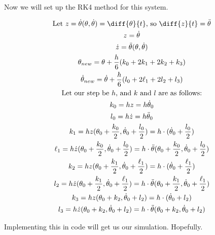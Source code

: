 \documentclass[]{article}
\begin{document}
Now we will set up the RK4 method for this system.

\begin{gather*}
	\text{Let } z = \dot{\theta}(\theta, \dot{\theta}) = \diff{\theta}{t} \text{, so } \diff{z}{t} = \ddot{\theta} \\
	z = \dot{\theta} \\
	\dot{z} = \ddot{\theta}(\theta, \dot{\theta}) \\
	\theta_{new} = \theta + \frac{h}{6}(k_0 + 2k_1 + 2k_2 + k_3) \\
	\dot{\theta}_{new} = \dot{\theta} + \frac{h}{6}(l_0 + 2\ell_1 + 2l_2 + l_3) \\
	\text{Let our step be $h$, and $k$ and $l$ are as follows:}\\
	k_0 = hz = h\dot{\theta}_0 \\
	l_0 = h\dot{z} = h\ddot{\theta}_0 \\
	k_1 = hz(\theta_0 + \frac{k_0}{2}, \dot{\theta}_0 + \frac{l_0}{2}) = h\cdot(\dot{\theta}_0 + \frac{l_0}{2}) \\
	\ell_1 = h\dot{z}(\theta_0 + \frac{k_0}{2}, \dot{\theta}_0 + \frac{l_0}{2}) = h\cdot\ddot{\theta}(\theta_0 + \frac{k_0}{2}, \dot{\theta}_0 + \frac{l_0}{2}) \\
	k_2 = hz(\theta_0 + \frac{k_1}{2}, \dot{\theta}_0 + \frac{\ell_1}{2}) = h\cdot(\dot{\theta}_0 + \frac{\ell_1}{2}) \\
	l_2 = h\dot{z}(\theta_0 + \frac{k_1}{2}, \dot{\theta}_0 + \frac{\ell_1}{2}) = h\cdot\ddot{\theta}(\theta_0 + \frac{k_1}{2}, \dot{\theta}_0 + \frac{\ell_1}{2}) \\
	k_3 = hz(\theta_0 + k_2, \dot{\theta}_0 + l_2) = h\cdot(\dot{\theta}_0 + l_2) \\
	l_3 = h\dot{z}(\theta_0 + k_2, \dot{\theta}_0 + l_2) = h\cdot\ddot{\theta}(\theta_0 + k_2, \dot{\theta}_0 + l_2)
\end{gather*}

Implementing this in code will get us our simulation. Hopefully.
\end{document}
